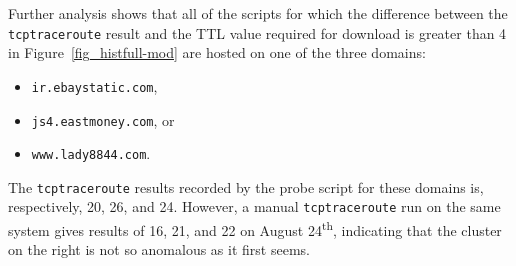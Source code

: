 Further analysis shows that all of the scripts for which the difference between the \texttt{tcptraceroute} result and the TTL value required for download is greater than 4 in Figure~\ref{fig_histfull-mod} are hosted on one of the three domains:
\begin{itemize}\addtolength{\itemsep}{-.35\baselineskip}
	\item \texttt{ir.ebaystatic.com},
	\item \texttt{js4.eastmoney.com}, or
	\item \texttt{www.lady8844.com}.
\end{itemize}
The \texttt{tcptraceroute} results recorded by the probe script for these domains is, respectively, 20, 26, and 24.
However, a manual \texttt{tcptraceroute} run on the same system gives results of 16, 21, and 22 on August 24\textsuperscript{th}, indicating that the cluster on the right is not so anomalous as it first seems.